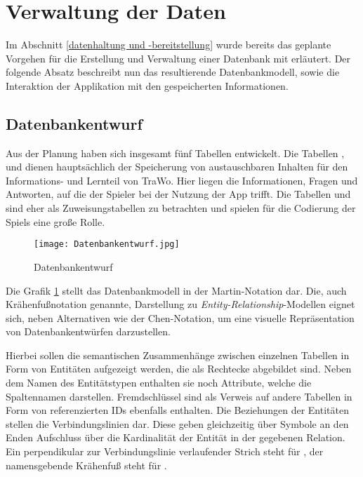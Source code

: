 \section{Verwaltung der Daten}
Im Abschnitt \ref{datenhaltung und -bereitstellung} wurde bereits das geplante Vorgehen für die Erstellung und Verwaltung einer Datenbank mit  erläutert. Der folgende Absatz beschreibt nun das resultierende Datenbankmodell, sowie die Interaktion der Applikation mit den gespeicherten Informationen.
\subsection{Datenbankentwurf}\label{datenbankentwurf}
Aus der Planung haben sich insgesamt fünf Tabellen entwickelt. Die Tabellen ,  und  dienen hauptsächlich der Speicherung von austauschbaren Inhalten für den Informations- und Lernteil von TraWo. Hier liegen die Informationen, Fragen und Antworten, auf die der Spieler bei der Nutzung der App trifft. Die Tabellen  und  sind eher als Zuweisungstabellen zu betrachten und spielen für die Codierung der Spiels eine große Rolle.

\begin{figure} [h]
\centering
\texttt{[image: Datenbankentwurf.jpg]}
\caption{Datenbankentwurf}
\label{fig:db_model}
\end{figure}

Die Grafik \ref{fig:db_model} stellt das Datenbankmodell in der Martin-Notation dar. Die, auch Krähenfußnotation genannte, Darstellung zu \textit{Entity-Relationship}-Modellen eignet sich, neben Alternativen wie der Chen-Notation, um eine visuelle Repräsentation von Datenbankentwürfen darzustellen. 

Hierbei sollen die semantischen Zusammenhänge zwischen einzelnen Tabellen in Form von Entitäten aufgezeigt werden, die als Rechtecke abgebildet sind. Neben dem Namen des Entitätstypen enthalten sie noch Attribute, welche die Spaltennamen darstellen. Fremdschlüssel sind als Verweis auf andere Tabellen in Form von referenzierten IDs ebenfalls enthalten. Die Beziehungen der Entitäten stellen die Verbindungslinien dar. Diese geben gleichzeitig über Symbole an den Enden Aufschluss über die Kardinalität der Entität in der gegebenen Relation. Ein perpendikular zur Verbindungslinie verlaufender Strich steht für , der namensgebende Krähenfuß steht für .

